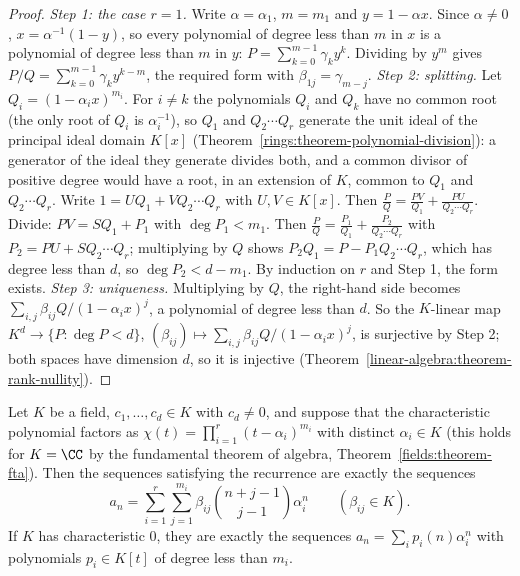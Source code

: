 \begin{proof}
\emph{Step 1: the case $r = 1$.} Write $\alpha = \alpha_1$, $m = m_1$ and $y = 1 - \alpha x$. Since $\alpha \neq 0$, $x = \alpha^{-1}(1 - y)$, so every polynomial of degree less than $m$ in $x$ is a
polynomial of degree less than $m$ in $y$: $P = \sum_{k=0}^{m-1}\gamma_ky^k$. Dividing by $y^m$ gives $P/Q = \sum_{k=0}^{m-1}\gamma_ky^{k-m}$, the required form with $\beta_{1j} = \gamma_{m-j}$.
\emph{Step 2: splitting.} Let $Q_i = (1 - \alpha_ix)^{m_i}$. For $i \neq k$ the polynomials $Q_i$ and $Q_k$ have no common root (the only root of $Q_i$ is $\alpha_i^{-1}$), so $Q_1$ and
$Q_2 \cdots Q_r$ generate the unit ideal of the principal ideal domain $K[x]$ (Theorem~\ref{rings:theorem-polynomial-division}): a generator of the ideal they generate divides both, and a common
divisor of positive degree would have a root, in an extension of $K$, common to $Q_1$ and $Q_2 \cdots Q_r$. Write $1 = UQ_1 + VQ_2 \cdots Q_r$ with $U, V \in K[x]$. Then
$\frac{P}{Q} = \frac{PV}{Q_1} + \frac{PU}{Q_2 \cdots Q_r}$. Divide: $PV = SQ_1 + P_1$ with $\deg P_1 < m_1$. Then $\frac{P}{Q} = \frac{P_1}{Q_1} + \frac{P_2}{Q_2 \cdots Q_r}$ with
$P_2 = PU + SQ_2 \cdots Q_r$; multiplying by $Q$ shows $P_2Q_1 = P - P_1Q_2 \cdots Q_r$, which has degree less than $d$, so $\deg P_2 < d - m_1$. By induction on $r$ and Step 1, the form exists.
\emph{Step 3: uniqueness.} Multiplying by $Q$, the right-hand side becomes $\sum_{i,j}\beta_{ij}Q/(1 - \alpha_ix)^j$, a polynomial of degree less than $d$. So the $K$-linear map
$K^d \to \{P : \deg P < d\}$, $(\beta_{ij}) \mapsto \sum_{i,j}\beta_{ij}Q/(1 - \alpha_ix)^j$, is surjective by Step 2; both spaces have dimension $d$, so it is injective
(Theorem~\ref{linear-algebra:theorem-rank-nullity}).
\end{proof}

\begin{theorem}\label{generating-functions:theorem-closed-form}
Let $K$ be a field, $c_1, \ldots, c_d \in K$ with $c_d \neq 0$, and suppose that the characteristic polynomial factors as $\chi(t) = \prod_{i=1}^{r}(t - \alpha_i)^{m_i}$ with distinct
$\alpha_i \in K$ (this holds for $K = \CC$ by the fundamental theorem of algebra, Theorem~\ref{fields:theorem-fta}). Then the sequences satisfying the recurrence are exactly the sequences
\[
a_n = \sum_{i=1}^{r}\sum_{j=1}^{m_i}\beta_{ij}\binom{n + j - 1}{j - 1}\alpha_i^n \qquad (\beta_{ij} \in K).
\]
If $K$ has characteristic $0$, they are exactly the sequences $a_n = \sum_ip_i(n)\alpha_i^n$ with polynomials $p_i \in K[t]$ of degree less than $m_i$.
\end{theorem}

